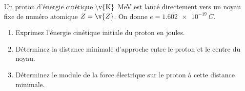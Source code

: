 Un proton d'énergie cinétique \qty{\v{K}}{MeV} est lancé directement vers un noyau fixe de numéro atomique $Z = \v{Z}$. On donne $e = \qty{1.602e-19}{C}$.

\begin{enumerate}[label=\alph*)]
    \item Exprimez l'énergie cinétique initiale du proton en joules.
    \item Déterminez la distance minimale d'approche entre le proton et le centre du noyau.
    \item Déterminez le module de la force électrique sur le proton à cette distance minimale.
\end{enumerate}
